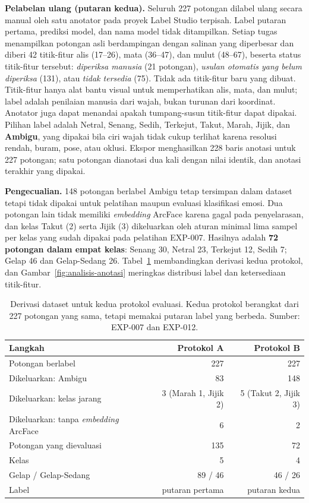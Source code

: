 \textbf{Pelabelan ulang (putaran kedua).} Seluruh 227 potongan dilabel ulang secara manual oleh satu anotator pada proyek Label Studio terpisah. Label putaran pertama, prediksi model, dan nama model tidak ditampilkan. Setiap tugas menampilkan potongan asli berdampingan dengan salinan yang diperbesar dan diberi 42 titik-fitur alis (17--26), mata (36--47), dan mulut (48--67), beserta status titik-fitur tersebut: \emph{diperiksa manusia} (21 potongan), \emph{usulan otomatis yang belum diperiksa} (131), atau \emph{tidak tersedia} (75). Tidak ada titik-fitur baru yang dibuat. Titik-fitur hanya alat bantu visual untuk memperhatikan alis, mata, dan mulut; label adalah penilaian manusia dari wajah, bukan turunan dari koordinat. Anotator juga dapat menandai apakah tumpang-susun titik-fitur dapat dipakai. Pilihan label adalah Netral, Senang, Sedih, Terkejut, Takut, Marah, Jijik, dan \textbf{Ambigu}, yang dipakai bila ciri wajah tidak cukup terlihat karena resolusi rendah, buram, pose, atau oklusi. Ekspor menghasilkan 228 baris anotasi untuk 227 potongan; satu potongan dianotasi dua kali dengan nilai identik, dan anotasi terakhir yang dipakai.

\textbf{Pengecualian.} 148 potongan berlabel Ambigu tetap tersimpan dalam dataset tetapi tidak dipakai untuk pelatihan maupun evaluasi klasifikasi emosi. Dua potongan lain tidak memiliki \textit{embedding} ArcFace karena gagal pada penyelarasan, dan kelas Takut (2) serta Jijik (3) dikeluarkan oleh aturan minimal lima sampel per kelas yang sudah dipakai pada pelatihan EXP-007. Hasilnya adalah \textbf{72 potongan dalam empat kelas}: Senang 30, Netral 23, Terkejut 12, Sedih 7; Gelap 46 dan Gelap-Sedang 26. Tabel~\ref{tab:derivasi-dataset} membandingkan derivasi kedua protokol, dan Gambar~\ref{fig:analisis-anotasi} meringkas distribusi label dan ketersediaan titik-fitur.

\begin{table}[htbp]
\centering
\caption[Derivasi dataset Protokol A dan Protokol B]{Derivasi dataset untuk kedua protokol evaluasi. Kedua protokol berangkat dari 227 potongan yang sama, tetapi memakai putaran label yang berbeda. Sumber: EXP-007 dan EXP-012.}
\label{tab:derivasi-dataset}
\small
\begin{tabular}{lrr}
\toprule
Langkah & Protokol A & Protokol B \\
\midrule
Potongan berlabel & 227 & 227 \\
Dikeluarkan: Ambigu & 83 & 148 \\
Dikeluarkan: kelas jarang & 3 (Marah 1, Jijik 2) & 5 (Takut 2, Jijik 3) \\
Dikeluarkan: tanpa \textit{embedding} ArcFace & 6 & 2 \\
\midrule
Potongan yang dievaluasi & 135 & 72 \\
Kelas & 5 & 4 \\
Gelap / Gelap-Sedang & 89 / 46 & 46 / 26 \\
Label & putaran pertama & putaran kedua \\
\bottomrule
\end{tabular}
\end{table}

